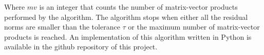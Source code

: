 \noindent Where $mv$ is an integer that counts the number of matrix-vector products performed by the algorithm. The algorithm stops when either all the residual norms are smaller than the tolerance $\tau$ or the maximum number of matrix-vector products is reached. An implementation of this algorithm written in Python is available in the github repository  of this project.






\clearpage